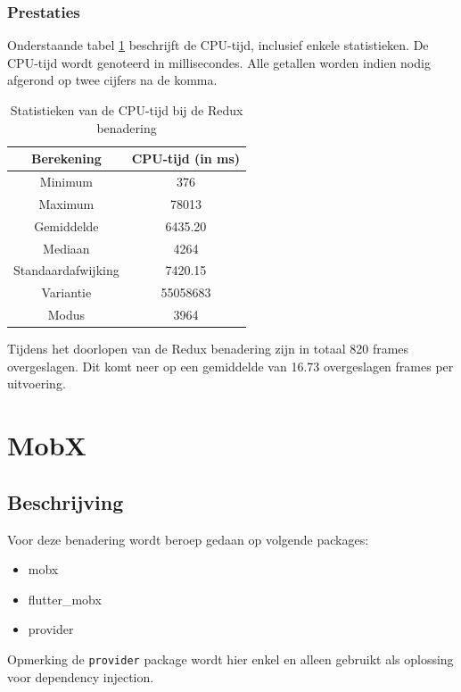 \subsubsection{Prestaties}
Onderstaande tabel \ref{table:experiment-redux-statistics} beschrijft de CPU-tijd, inclusief enkele statistieken. De CPU-tijd wordt genoteerd in millisecondes. Alle getallen worden indien nodig afgerond op twee cijfers na de komma.
\begin{table}[H]
    \centering
    \begin{tabular}{c|c}
        \textbf{Berekening} & \textbf{CPU-tijd (in ms)} \\ \hline
        Minimum             & 376                       \\ \hline
        Maximum             & 78013                     \\ \hline
        Gemiddelde          & 6435.20                   \\ \hline
        Mediaan             & 4264                      \\ \hline
        Standaardafwijking  & 7420.15                   \\ \hline
        Variantie           & 55058683                  \\ \hline
        Modus               & 3964                      \\                
    \end{tabular}
    \caption{Statistieken van de CPU-tijd bij de Redux benadering}
    \label{table:experiment-redux-statistics}
\end{table}

Tijdens het doorlopen van de Redux benadering zijn in totaal 820 frames overgeslagen. Dit komt neer op een gemiddelde van 16.73 overgeslagen frames per uitvoering.

\section{MobX}
\subsection{Beschrijving}

Voor deze benadering wordt beroep gedaan op volgende packages: 
\begin{itemize}
    \item{mobx}
    \item{flutter\_mobx}
    \item{provider}
\end{itemize}
Opmerking de \verb|provider| package wordt hier enkel en alleen gebruikt als oplossing voor dependency injection.

